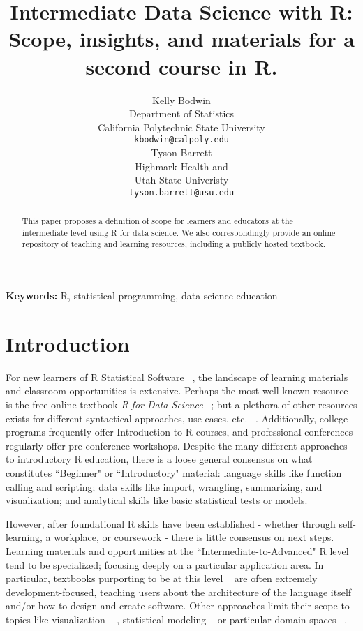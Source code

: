 \documentclass[10pt]{article}
\title{Intermediate Data Science with R: \\
Scope, insights, and materials for a second course in R.}
\author{
  Kelly Bodwin \\
  Department of Statistics \\
  California Polytechnic State University \\
  {\tt kbodwin@calpoly.edu} \\\And
 Tyson Barrett \\
  Highmark Health and  \\
  Utah State Univeristy \\
  {\tt tyson.barrett@usu.edu}   
}
\date{}
\begin{document}
\maketitle
\begin{abstract}
This paper proposes a definition of scope for learners and educators at the intermediate level using R for data science.  We also correspondingly provide an online repository of teaching and learning resources, including a publicly hosted textbook.
\end{abstract}

{\bf Keywords:} R, statistical programming, data science education

\section{Introduction}

For new learners of R Statistical Software ~\cite{RStats}, the landscape of learning materials and classroom opportunities is extensive.  Perhaps the most well-known resource is the free online textbook \emph{R for Data Science} ~\cite{wickham2023r}; but a plethora of other resources exists for different syntactical approaches, use cases, etc.  ~\cite{crawley2012r,verzani2004using,navarro2015learning}.  Additionally, college programs frequently offer Introduction to R courses, and professional conferences regularly offer pre-conference workshops.  Despite the many different approaches to introductory R education, there is a loose general consensus on what constitutes ``Beginner" or ``Introductory" material: language skills like function calling and scripting; data skills like import, wrangling, summarizing, and visualization; and analytical skills like basic statistical tests or models.

However, after foundational R skills have been established - whether through self-learning, a workplace, or coursework - there is little consensus on next steps.  Learning materials and opportunities at the ``Intermediate-to-Advanced" R level tend to be specialized; focusing deeply on a particular application area.  In particular, textbooks purporting to be at this level ~\cite{matloff2011art,wickham2019advanced}  are often extremely development-focused, teaching users about the architecture of the language itself and/or how to design and create software.  Other approaches limit their scope to topics like visualization ~\cite{sievert2020interactive,wilke2019fundamentals} , statistical modeling ~\cite{hastie2009introduction} or particular domain spaces ~\cite{gentleman2005bioinformatics}.
\end{document}
